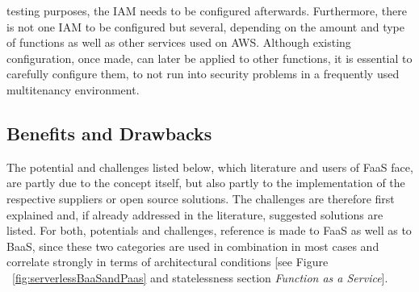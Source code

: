 \documentclass[a4paper,twoside,11pt, pagesize]{scrartcl}
\begin{document}
\begin{spacing}{1.2}
testing purposes, the IAM needs to be configured afterwards. Furthermore, there is not one IAM to be configured but several, depending on the amount and type of functions as well as other services used on AWS. Although existing configuration, once made, can later be applied to other functions, it is essential to carefully configure them, to not run into security problems in a frequently used multitenancy environment.
\subsection{Benefits and Drawbacks}
The potential and challenges listed below, which literature and users of FaaS face, are partly due to the concept itself, but also partly to the implementation of the respective suppliers or open source solutions. The challenges are therefore first explained and, if already addressed in the literature, suggested solutions are listed. For both, potentials and challenges, reference is made to FaaS as well as to BaaS, since these two categories are used in combination in most cases and correlate strongly in terms of architectural conditions [see Figure ~\ref{fig:serverlessBaaSandPaas} and \glqq statelessness\grqqq{} section \textit{Function as a Service}].

\end{spacing}
\end{document}

